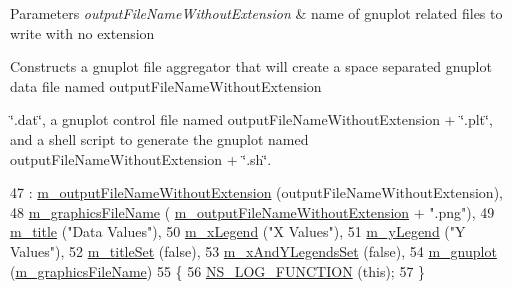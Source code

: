 \begin{DoxyParams}{Parameters}
{\em output\+File\+Name\+Without\+Extension} & name of gnuplot related files to write with no extension\\
\hline
\end{DoxyParams}
Constructs a gnuplot file aggregator that will create a space separated gnuplot data file named output\+File\+Name\+Without\+Extension
\begin{DoxyItemize}
\item \char`\"{}.\+dat\char`\"{}, a gnuplot control file named output\+File\+Name\+Without\+Extension + \char`\"{}.\+plt\char`\"{}, and a shell script to generate the gnuplot named output\+File\+Name\+Without\+Extension + \char`\"{}.\+sh\char`\"{}. 
\end{DoxyItemize}
\begin{DoxyCode}
47   : \hyperlink{classns3_1_1GnuplotAggregator_a3bfca1f816d054b5bb88438b9417c912}{m\_outputFileNameWithoutExtension} (outputFileNameWithoutExtension),
48     \hyperlink{classns3_1_1GnuplotAggregator_a1c71e8a1f4b1b2ff4d2802a257e26e2a}{m\_graphicsFileName}               (
      \hyperlink{classns3_1_1GnuplotAggregator_a3bfca1f816d054b5bb88438b9417c912}{m\_outputFileNameWithoutExtension} + \textcolor{stringliteral}{".png"}),
49     \hyperlink{classns3_1_1GnuplotAggregator_a00cf8d3633f1f62bda0be5b5f1fa1f93}{m\_title}                          (\textcolor{stringliteral}{"Data Values"}),
50     \hyperlink{classns3_1_1GnuplotAggregator_a68be1be101e20dfc199a7ddd48015fe7}{m\_xLegend}                        (\textcolor{stringliteral}{"X Values"}),
51     \hyperlink{classns3_1_1GnuplotAggregator_a3219ced94e278496e0b6cf69f251ad85}{m\_yLegend}                        (\textcolor{stringliteral}{"Y Values"}),
52     \hyperlink{classns3_1_1GnuplotAggregator_a43ddb8f3edfd6d01c2f18f9fef04c1bd}{m\_titleSet}                       (\textcolor{keyword}{false}),
53     \hyperlink{classns3_1_1GnuplotAggregator_a1eb3308b08bc0b37b7d46c8908d14db7}{m\_xAndYLegendsSet}                (\textcolor{keyword}{false}),
54     \hyperlink{classns3_1_1GnuplotAggregator_a152975e86bbfbc344ff39d8917a9190f}{m\_gnuplot}                        (\hyperlink{classns3_1_1GnuplotAggregator_a1c71e8a1f4b1b2ff4d2802a257e26e2a}{m\_graphicsFileName})
55 \{
56   \hyperlink{log-macros-disabled_8h_a90b90d5bad1f39cb1b64923ea94c0761}{NS\_LOG\_FUNCTION} (\textcolor{keyword}{this});
57 \}
\end{DoxyCode}

